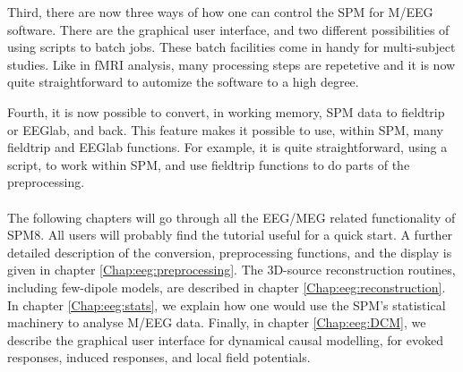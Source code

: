 Third, there are now three ways of how one can control the
SPM for M/EEG software. There are the graphical user interface, and two
different possibilities of using scripts to batch jobs. These batch
facilities come in handy for multi-subject studies. Like in fMRI
analysis, many processing steps are repetetive and it is now quite
straightforward to automize the software to a high degree.

Fourth, it is now possible to convert, in working memory, SPM
data to fieldtrip or EEGlab, and back. This feature makes it possible to 
use, within SPM, many fieldtrip and EEGlab functions. For example, it
is quite straightforward, using a script, to work within SPM, and use
fieldtrip functions to do parts of the preprocessing. 
\\
\\
The following chapters will go through all the EEG/MEG related
functionality of SPM8. All users will probably find the tutorial
useful for a quick start. A further detailed description of the
conversion, preprocessing functions, and the display is given in chapter
\ref{Chap:eeg:preprocessing}. The 3D-source reconstruction routines,
including few-dipole models, are described in chapter
\ref{Chap:eeg:reconstruction}. In chapter \ref{Chap:eeg:stats}, we
explain how one would use the SPM's statistical machinery to analyse
M/EEG data. Finally, in chapter \ref{Chap:eeg:DCM}, we describe the
graphical user interface for dynamical causal modelling, for evoked  
responses, induced responses, and local field potentials.

